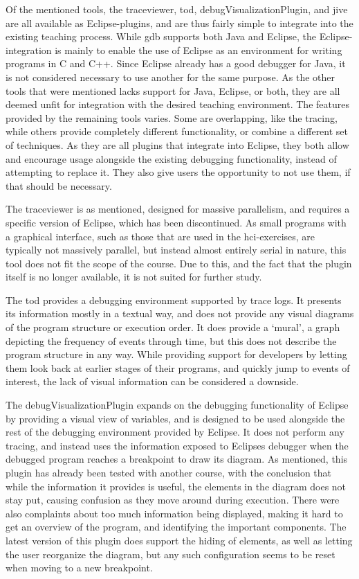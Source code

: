 Of the mentioned tools, the \gls{traceviewer}, \gls{tod}, \gls{debugVisualizationPlugin}, and \gls{jive} are all available as Eclipse-plugins, and are thus fairly simple to integrate into the existing teaching process.
While \gls{gdb} supports both Java and Eclipse, the Eclipse-integration is mainly to enable the use of Eclipse as an environment for writing programs in C and C++.
Since Eclipse already has a good debugger for Java, it is not considered necessary to use another for the same purpose.
As the other tools that were mentioned lacks support for Java, Eclipse, or both, they are all deemed unfit for integration with the desired teaching environment.
The features provided by the remaining tools varies.
Some are overlapping, like the tracing, while others provide completely different functionality, or combine a different set of techniques.
As they are all plugins that integrate into Eclipse, they both allow and encourage usage alongside the existing debugging functionality, instead of attempting to replace it.
They also give users the opportunity to not use them, if that should be necessary.

The \gls{traceviewer} is as mentioned, designed for massive parallelism, and requires a specific version of Eclipse, which has been discontinued.
As small programs with a graphical interface, such as those that are used in the \gls{hci}-exercises, are typically not massively parallel, but instead almost entirely serial in nature, this tool does not fit the scope of the course.
Due to this, and the fact that the plugin itself is no longer available, it is not suited for further study.

The \gls{tod} provides a debugging environment supported by trace logs.
It presents its information mostly in a textual way, and does not provide any visual diagrams of the program structure or execution order.
It does provide a `mural', a graph depicting the frequency of events through time, but this does not describe the program structure in any way.
While providing support for developers by letting them look back at earlier stages of their programs, and quickly jump to events of interest, the lack of visual information can be considered a downside.

The \gls{debugVisualizationPlugin} expands on the debugging functionality of Eclipse by providing a visual view of variables, and is designed to be used alongside the rest of the debugging environment provided by Eclipse.
It does not perform any tracing, and instead uses the information exposed to Eclipses debugger when the debugged program reaches a breakpoint to draw its diagram.
As mentioned, this plugin has already been tested with another course, with the conclusion that while the information it provides is useful, the elements in the diagram does not stay put, causing confusion as they move around during execution.
There were also complaints about too much information being displayed, making it hard to get an overview of the program, and identifying the important components.
The latest version of this plugin does support the hiding of elements, as well as letting the user reorganize the diagram, but any such configuration seems to be reset when moving to a new breakpoint.

